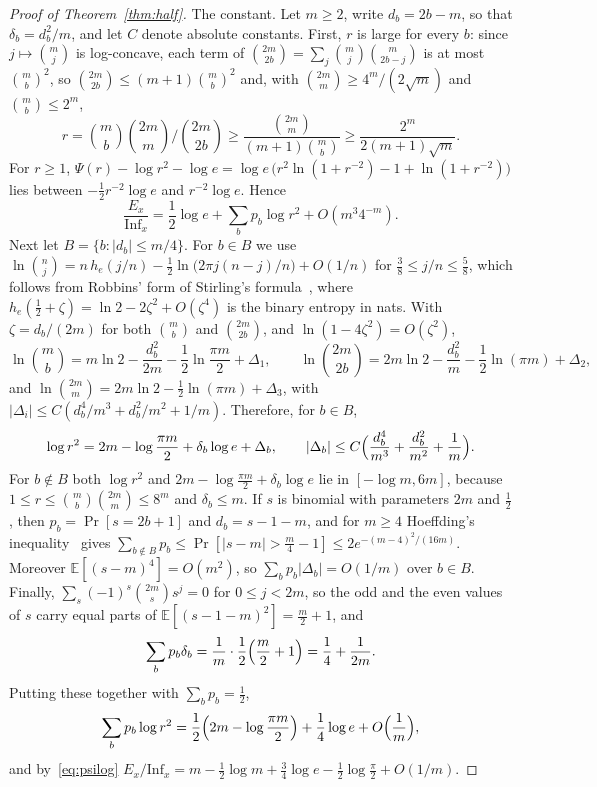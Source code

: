 \documentclass[11pt]{amsart}
\theoremstyle{remark}
\newcommand{\Inf}{\mathrm{Inf}}
\newcommand{\E}{\mathbb{E}}
\begin{document}
\begin{proof}[Proof of Theorem~\ref{thm:half}]
The constant. Let $m\ge2$, write $d_b=2b-m$, so that $\delta_b=d_b^2/m$, and let $C$ denote absolute constants.
First, $r$ is large for every $b$: since $j\mapsto\binom mj$ is log-concave, each term of
$\binom{2m}{2b}=\sum_j\binom mj\binom m{2b-j}$ is at most $\binom mb^2$, so $\binom{2m}{2b}\le(m+1)\binom mb^2$ and,
with $\binom{2m}m\ge4^m/(2\sqrt m)$ and $\binom mb\le2^m$,
\[
r=\binom mb\binom{2m}m\Big/\binom{2m}{2b}\ge\frac{\binom{2m}m}{(m+1)\binom mb}\ge\frac{2^m}{2(m+1)\sqrt m}.
\]
For $r\ge1$, $\Psi(r)-\log r^2-\log e=\log e\,\bigl(r^2\ln(1+r^{-2})-1+\ln(1+r^{-2})\bigr)$ lies between
$-\frac12r^{-2}\log e$ and $r^{-2}\log e$. Hence
\begin{equation}\label{eq:psilog}
\frac{E_x}{\Inf_x}=\frac12\log e+\sum_bp_b\log r^2+O(m^3 4^{-m}).
\end{equation}
Next let $B=\{b:|d_b|\le m/4\}$. For $b\in B$ we use $\ln\binom nj=n\,h_e(j/n)-\frac12\ln\bigl(2\pi j(n-j)/n\bigr)
+O(1/n)$ for $\frac38\le j/n\le\frac58$, which follows from Robbins' form of Stirling's formula~\cite{Rob55}, where
$h_e(\frac12+\zeta)=\ln2-2\zeta^2+O(\zeta^4)$ is the binary entropy in nats. With $\zeta=d_b/(2m)$ for both
$\binom mb$ and $\binom{2m}{2b}$, and $\ln(1-4\zeta^2)=O(\zeta^2)$,
\[
\ln\binom mb=m\ln2-\frac{d_b^2}{2m}-\frac12\ln\frac{\pi m}2+\Delta_1,\qquad
\ln\binom{2m}{2b}=2m\ln2-\frac{d_b^2}m-\frac12\ln(\pi m)+\Delta_2,
\]
and $\ln\binom{2m}m=2m\ln2-\frac12\ln(\pi m)+\Delta_3$, with
$|\Delta_i|\le C(d_b^4/m^3+d_b^2/m^2+1/m)$. Therefore, for $b\in B$,
\[
\log r^2=2m-\log\frac{\pi m}2+\delta_b\log e+\Delta_b,\qquad|\Delta_b|\le C\Bigl(\frac{d_b^4}{m^3}
+\frac{d_b^2}{m^2}+\frac1m\Bigr).
\]
For $b\notin B$ both $\log r^2$ and $2m-\log\frac{\pi m}2+\delta_b\log e$ lie in $[-\log m,6m]$, because
$1\le r\le\binom mb\binom{2m}m\le8^m$ and $\delta_b\le m$. If $s$ is binomial with parameters $2m$ and $\frac12$, then
$p_b=\Pr[s=2b+1]$ and $d_b=s-1-m$, and for $m\ge4$ Hoeffding's inequality~\cite[Theorem~2]{Hoe63} gives
$\sum_{b\notin B}p_b\le\Pr[|s-m|>\frac m4-1]\le2e^{-(m-4)^2/(16m)}$. Moreover $\E[(s-m)^4]=O(m^2)$, so $\sum_bp_b|\Delta_b|=O(1/m)$ over $b\in B$. Finally,
$\sum_s(-1)^s\binom{2m}ss^j=0$ for $0\le j<2m$, so the odd and the even values of
$s$ carry equal parts of $\E[(s-1-m)^2]=\frac m2+1$, and
\[
\sum_bp_b\delta_b=\frac1m\cdot\frac12\Bigl(\frac m2+1\Bigr)=\frac14+\frac1{2m}.
\]
Putting these together with $\sum_bp_b=\frac12$,
\[
\sum_bp_b\log r^2=\frac12\Bigl(2m-\log\frac{\pi m}2\Bigr)+\frac14\log e+O\Bigl(\frac1m\Bigr),
\]
and by~\eqref{eq:psilog} $E_x/\Inf_x=m-\frac12\log m+\frac34\log e-\frac12\log\frac\pi2+O(1/m)$.
\end{proof}
\end{document}
